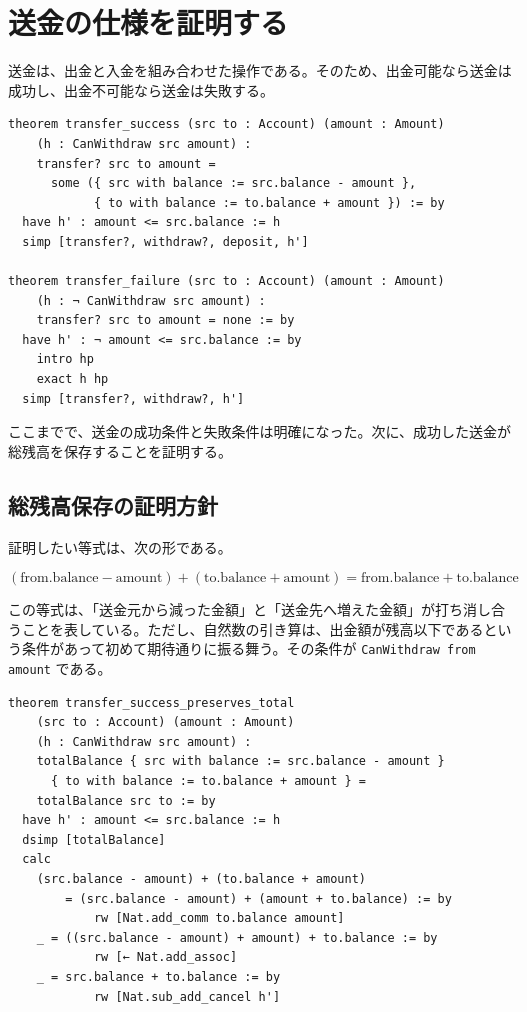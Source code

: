 \section{送金の仕様を証明する}

送金は、出金と入金を組み合わせた操作である。そのため、出金可能なら送金は成功し、出金不可能なら送金は失敗する。

\begin{listing}[htbp]
\begin{verbatim}
theorem transfer_success (src to : Account) (amount : Amount)
    (h : CanWithdraw src amount) :
    transfer? src to amount =
      some ({ src with balance := src.balance - amount },
            { to with balance := to.balance + amount }) := by
  have h' : amount <= src.balance := h
  simp [transfer?, withdraw?, deposit, h']

theorem transfer_failure (src to : Account) (amount : Amount)
    (h : ¬ CanWithdraw src amount) :
    transfer? src to amount = none := by
  have h' : ¬ amount <= src.balance := by
    intro hp
    exact h hp
  simp [transfer?, withdraw?, h']
\end{verbatim}
\caption{送金の成功・失敗仕様}
\label{lst:ch19-transfer-cases}
\end{listing}

ここまでで、送金の成功条件と失敗条件は明確になった。次に、成功した送金が総残高を保存することを証明する。

\subsection{総残高保存の証明方針}

証明したい等式は、次の形である。

\[
  (\mathrm{from.balance} - \mathrm{amount})
  + (\mathrm{to.balance} + \mathrm{amount})
  =
  \mathrm{from.balance} + \mathrm{to.balance}
\]

この等式は、「送金元から減った金額」と「送金先へ増えた金額」が打ち消し合うことを表している。ただし、自然数の引き算は、出金額が残高以下であるという条件があって初めて期待通りに振る舞う。その条件が \texttt{CanWithdraw from amount} である。

\begin{listing}[htbp]
\begin{verbatim}
theorem transfer_success_preserves_total
    (src to : Account) (amount : Amount)
    (h : CanWithdraw src amount) :
    totalBalance { src with balance := src.balance - amount }
      { to with balance := to.balance + amount } =
    totalBalance src to := by
  have h' : amount <= src.balance := h
  dsimp [totalBalance]
  calc
    (src.balance - amount) + (to.balance + amount)
        = (src.balance - amount) + (amount + to.balance) := by
            rw [Nat.add_comm to.balance amount]
    _ = ((src.balance - amount) + amount) + to.balance := by
            rw [← Nat.add_assoc]
    _ = src.balance + to.balance := by
            rw [Nat.sub_add_cancel h']
\end{verbatim}
\caption{送金成功時の総残高保存}
\label{lst:ch19-transfer-total-proof}
\end{listing}

